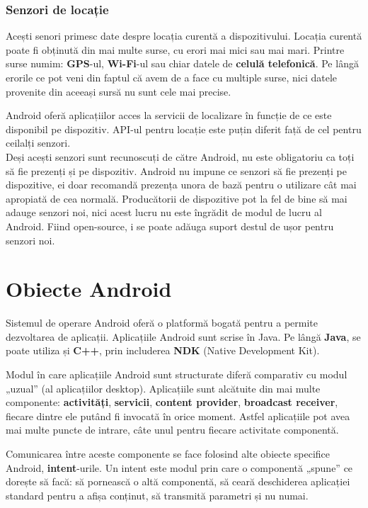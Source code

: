 \documentclass[12pt,a4paper]{article}
\begin{document}
\subsubsection{Senzori de locație}
Acești senori primesc date despre locația curentă a dispozitivului. Locația curentă poate fi obținută din mai multe surse, cu erori mai mici sau mai mari. Printre surse numim: \textbf{GPS}-ul, \textbf{Wi-Fi}-ul sau chiar datele de \textbf{celulă telefonică}. Pe lângă erorile ce pot veni din faptul că avem de a face cu multiple surse, nici datele provenite din aceeași sursă nu sunt cele mai precise.

Android oferă aplicațiilor acces la servicii de localizare în funcție de ce este disponibil pe dispozitiv. API-ul pentru locație este puțin diferit față de cel pentru ceilalți senzori.\\

Deși acești senzori sunt recunoscuți de către Android, nu este obligatoriu ca toți să fie prezenți și pe dispozitiv. Android nu impune ce senzori să fie prezenți pe dispozitive, ei doar recomandă prezența unora de bază pentru o utilizare cât mai apropiată de cea normală. Producătorii de dispozitive pot la fel de bine să mai adauge senzori noi, nici acest lucru nu este îngrădit de modul de lucru al Android. Fiind open-source, i se poate adăuga suport destul de ușor pentru senzori noi.


\section{Obiecte Android}
Sistemul de operare Android oferă o platformă bogată pentru a permite dezvoltarea de aplicații. Aplicațiile Android sunt scrise în Java. Pe lângă \textbf{Java}, se poate utiliza și \textbf{C++}, prin includerea \textbf{NDK} (Native Development Kit).

Modul în care aplicațiile Android sunt structurate diferă comparativ cu modul „uzual” (al aplicațiilor desktop). Aplicațiile sunt alcătuite din mai multe componente: \textbf{activități}, \textbf{servicii}, \textbf{content provider}, \textbf{broadcast receiver}, fiecare dintre ele putând fi invocată în orice moment. Astfel aplicațiile pot avea mai multe puncte de intrare, câte unul pentru fiecare activitate componentă.

Comunicarea între aceste componente se face folosind alte obiecte specifice Android, \textbf{intent}-urile. Un intent este modul prin care o componentă „spune” ce dorește să facă: să pornească o altă componentă, să ceară deschiderea aplicației standard pentru a afișa conținut, să transmită parametri și nu numai.
\end{document}

